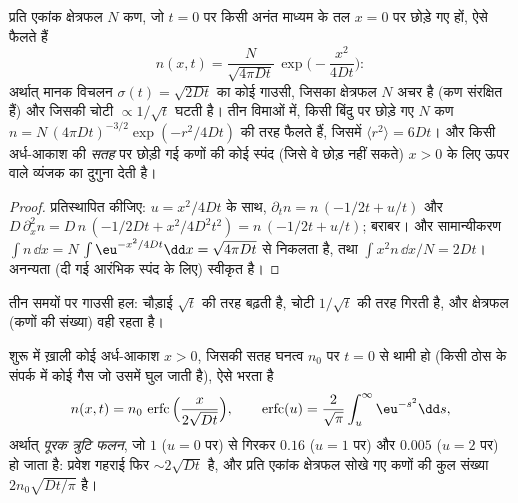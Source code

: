 \begin{proposition}[फैलता गाउसी]\label{prop:b2:particle-diffusion:gaussian}
प्रति एकांक क्षेत्रफल $N$ कण, जो $t = 0$ पर किसी अनंत माध्यम के तल $x = 0$ पर
छोड़े गए हों, ऐसे फैलते हैं
\[
n(x,t) = \frac{N}{\sqrt{4\pi D t}}\,\exp\Big(-\frac{x^2}{4Dt}\Big) :
\]
अर्थात् मानक विचलन $\sigma(t) = \sqrt{2Dt}$ का कोई गाउसी, जिसका
क्षेत्रफल $N$ अचर है (कण संरक्षित हैं) और जिसकी चोटी $\propto
1/\sqrt t$ घटती है। तीन विमाओं में, किसी बिंदु पर छोड़े गए $N$ कण
$n = N\,(4\pi Dt)^{-3/2}\exp(-r^2/4Dt)$ की तरह फैलते हैं, जिसमें $\langle r^2
\rangle = 6Dt$। और किसी अर्ध-आकाश की \emph{सतह} पर छोड़ी गई कणों की कोई स्पंद
(जिसे वे छोड़ नहीं सकते) $x > 0$ के लिए ऊपर वाले व्यंजक का
दुगुना देती है।
\end{proposition}

\begin{proof}
प्रतिस्थापित कीजिए: $u = x^2/4Dt$ के साथ, $\partial_t n = n\,(-1/2t + u/t)$ और
$D\,\partial_x^2 n = D\,n\,(-1/2Dt + x^2/4D^2t^2) = n\,(-1/2t + u/t)$;
बराबर। और सामान्यीकरण $\int n\,\dd x = N$ $\int
\eu^{-x^2/4Dt}\dd x = \sqrt{4\pi Dt}$ से निकलता है, तथा $\int x^2 n\,\dd x/N = 2Dt$।
अनन्यता (दी गई आरंभिक स्पंद के लिए) स्वीकृत है।
\end{proof}

\begin{omfigure}

{\small तीन समयों पर गाउसी हल: चौड़ाई
$\sqrt t$ की तरह बढ़ती है, चोटी $1/\sqrt t$ की तरह गिरती है, और क्षेत्रफल (कणों की
संख्या) वही रहता है।}
\end{omfigure}

\begin{proposition}\label{prop:b2:particle-diffusion:erfc}
शुरू में ख़ाली कोई अर्ध-आकाश $x > 0$, जिसकी सतह घनत्व $n_0$ पर
$t = 0$ से थामी हो (किसी ठोस के संपर्क में कोई गैस जो उसमें
घुल जाती है), ऐसे भरता है
\[
n(x,t) = n_0\,\operatorname{erfc}\Big(\frac{x}{2\sqrt{Dt}}\Big),
\qquad
\operatorname{erfc}(u) = \frac{2}{\sqrt\pi}\int_u^{\infty}\eu^{-s^2}\dd s,
\]
अर्थात् \emph{पूरक त्रुटि फलन}, जो $1$ ($u =
0$ पर) से गिरकर $0.16$ ($u = 1$ पर) और $0.005$ ($u = 2$ पर) हो जाता है: प्रवेश गहराई
फिर $\sim 2\sqrt{Dt}$ है, और प्रति एकांक क्षेत्रफल सोखे गए कणों की
कुल संख्या $2n_0\sqrt{Dt/\pi}$ है।
\end{proposition}


